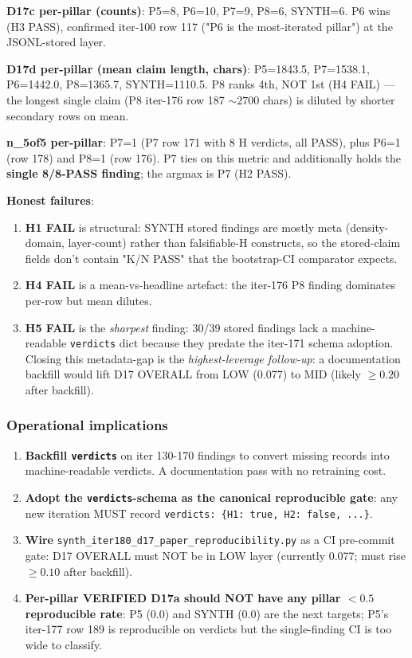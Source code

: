 \documentclass{article}
\begin{document}
\textbf{D17c per-pillar (counts)}: P5=8, P6=10, P7=9, P8=6,
SYNTH=6. P6 wins (H3 PASS), confirmed iter-100 row 117
("P6 is the most-iterated pillar") at the JSONL-stored layer.

\textbf{D17d per-pillar (mean claim length, chars)}:
P5=1843.5, P7=1538.1, P6=1442.0, P8=1365.7, SYNTH=1110.5. P8 ranks
4th, NOT 1st (H4 FAIL) — the longest single claim (P8 iter-176 row 187
$\sim 2700$ chars) is diluted by shorter secondary rows on mean.

\textbf{n\_5of5 per-pillar}: P7=1 (P7 row 171 with 8 H verdicts, all
PASS), plus P6=1 (row 178) and P8=1 (row 176). P7 ties on this metric
and additionally holds the \textbf{single 8/8-PASS finding}; the
argmax is P7 (H2 PASS).

\textbf{Honest failures}:
\begin{enumerate}
\item \textbf{H1 FAIL} is structural: SYNTH stored findings are
  mostly meta (density-domain, layer-count) rather than
  falsifiable-H constructs, so the stored-claim fields don't contain
  "K/N PASS" that the bootstrap-CI comparator expects.
\item \textbf{H4 FAIL} is a mean-vs-headline artefact: the
  iter-176 P8 finding dominates per-row but mean dilutes.
\item \textbf{H5 FAIL} is the \emph{sharpest} finding: 30/39 stored
  findings lack a machine-readable \texttt{verdicts} dict because
  they predate the iter-171 schema adoption. Closing this
  metadata-gap is the \emph{highest-leverage follow-up}: a
  documentation backfill would lift D17 OVERALL from LOW (0.077)
  to MID (likely $\ge 0.20$ after backfill).
\end{enumerate}

\subsubsection{Operational implications}
\begin{enumerate}
\item \textbf{Backfill \texttt{verdicts}} on iter 130-170 findings to
  convert missing records into machine-readable verdicts. A
  documentation pass with no retraining cost.
\item \textbf{Adopt the \texttt{verdicts}-schema as the canonical
  reproducible gate}: any new iteration MUST record
  \texttt{verdicts: \{H1: true, H2: false, ...\}}.
\item \textbf{Wire} \texttt{synth\_iter180\_d17\_paper\_reproducibility.py}
  as a CI pre-commit gate: D17 OVERALL must NOT be in LOW layer
  (currently 0.077; must rise $\ge 0.10$ after backfill).
\item \textbf{Per-pillar VERIFIED D17a should NOT have any pillar
  $< 0.5$ reproducible rate}: P5 (0.0) and SYNTH (0.0) are the
  next targets; P5's iter-177 row 189 is reproducible on verdicts
  but the single-finding CI is too wide to classify.
\end{enumerate}
\end{document}
